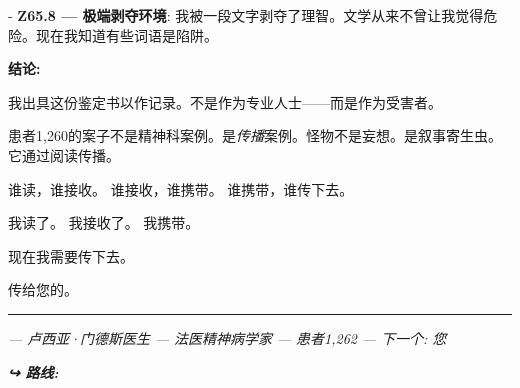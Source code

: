 \noindent - \textbf{Z65.8 --- 极端剥夺环境}: 我被一段文字剥夺了理智。文学从来不曾让我觉得危险。现在我知道有些词语是陷阱。

\noindent \textbf{结论:}

\noindent 我出具这份鉴定书以作记录。不是作为专业人士——而是作为受害者。

\noindent 患者1,260的案子不是精神科案例。是\textit{传播}案例。怪物不是妄想。是叙事寄生虫。它通过阅读传播。

\noindent 谁读，谁接收。
\noindent 谁接收，谁携带。
\noindent 谁携带，谁传下去。

\noindent 我读了。
\noindent 我接收了。
\noindent 我携带。

\noindent 现在我需要传下去。

\noindent 传给您的。

\vspace{0.5em}\noindent\rule{\textwidth}{0.5pt}\vspace{0.5em}

\noindent \textit{--- 卢西亚·门德斯医生}
\noindent \textit{--- 法医精神病学家}
\noindent \textit{--- 患者1,262}
\noindent \textit{--- 下一个: 您}

\vspace{0.5em}
\noindent\textit{\textbf{↪ 路线:}  \rotasep {}}
